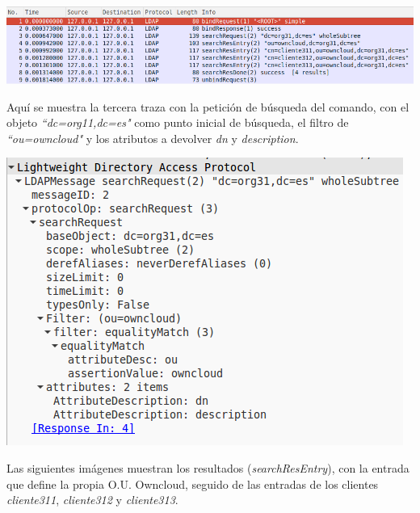 \documentclass[]{article}
\begin{document}
\begin{center}
\includegraphics[scale=0.5]{images/ldap/ldap1}
\end{center}

Aquí se muestra la tercera traza con la petición de búsqueda del comando, con el objeto \textit{“dc=org11,dc=es"} como punto inicial de búsqueda, el filtro de \textit{“ou=owncloud"} y los atributos a devolver \textit{dn} y \textit{description}.

\begin{center}
	\includegraphics[scale=0.5]{images/ldap/ldap2}
\end{center}

Las siguientes imágenes muestran los resultados (\textit{searchResEntry}), con la entrada que define la propia O.U. Owncloud, seguido de las entradas de los clientes \textit{cliente311}, \textit{cliente312} y \textit{cliente313}.
\end{document}
